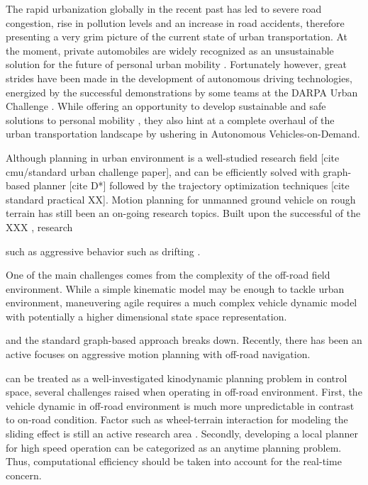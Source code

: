 \documentclass[../thesis.tex]{subfiles}
\begin{document}


The rapid urbanization globally in the recent past has led to severe road congestion, rise in pollution levels and an increase in road accidents, therefore presenting a very grim picture of the current state of urban transportation. At the moment, private automobiles are widely recognized as an unsustainable solution for the future of personal urban mobility \cite{reinventing}. Fortunately however, great strides have been made in the development of autonomous driving technologies, energized by the successful demonstrations by some teams at the DARPA Urban Challenge \cite{boss, multimodaltartan}. While offering an opportunity to develop sustainable and safe solutions to personal mobility \cite{usecases_of_AD}, they also hint at a complete overhaul of the urban transportation landscape by ushering in Autonomous Vehicles-on-Demand. 


Although planning in urban environment is a well-studied research field [cite cmu/standard urban challenge paper], and can be efficiently solved with graph-based planner [cite D*] followed by the trajectory optimization techniques [cite standard practical XX]. 
Motion planning for unmanned ground vehicle on rough terrain has still been an on-going research topics. Built upon the successful of the XXX \cite{}, research 

such as aggressive behavior 
such as drifting \cite{}.

One of the main challenges comes from the complexity of the off-road field environment. While a simple kinematic model may be enough to tackle urban environment, maneuvering agile requires a much complex vehicle dynamic model with potentially a higher dimensional state space representation. 

and the standard graph-based approach breaks down. Recently, there has been an active focuses on aggressive motion planning with off-road navigation.  


can be treated as a well-investigated kinodynamic planning problem in control space, several challenges raised when operating in off-road environment. 
First, the vehicle dynamic in off-road environment is much more unpredictable in contrast to on-road condition. Factor such as wheel-terrain interaction for modeling the sliding effect is still an active research area . 
Secondly, developing a local planner for high speed operation can be categorized as an anytime planning problem. Thus, computational efficiency should be taken into account for the real-time concern.
\end{document}

